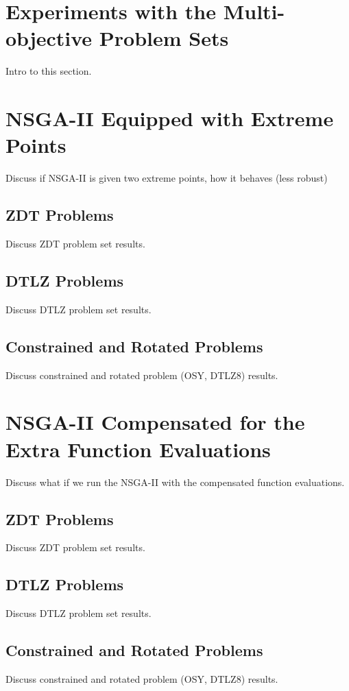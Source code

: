 \documentclass[journal]{IEEEtran}
\begin{document}
\section{Experiments with the Multi-objective Problem Sets}
Intro to this section.

\section{NSGA-II Equipped with Extreme Points}
Discuss if NSGA-II is given two extreme points, how it behaves (less robust)

\subsection{ZDT Problems}
Discuss ZDT problem set results.

\subsection{DTLZ Problems}
Discuss DTLZ problem set results.

\subsection{Constrained and Rotated Problems}
Discuss constrained and rotated problem (OSY, DTLZ8) results.

\section{NSGA-II Compensated for the Extra Function Evaluations}
Discuss what if we run the NSGA-II with the compensated function evaluations.  

\subsection{ZDT Problems}
Discuss ZDT problem set results.

\subsection{DTLZ Problems}
Discuss DTLZ problem set results.

\subsection{Constrained and Rotated Problems}
Discuss constrained and rotated problem (OSY, DTLZ8) results.
\end{document}
